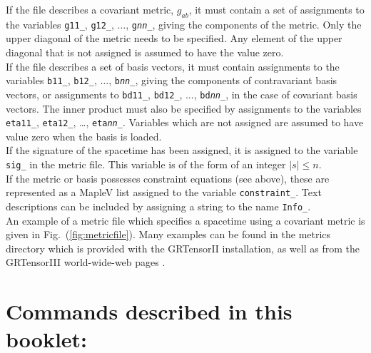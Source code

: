 \documentclass{article}
\begin{document}
If the file describes a covariant metric, $g_{ab}$, it must contain a
set of assignments to the variables \texttt{g11\_}, \texttt{g12\_},
$\ldots$, \texttt{g\textsl{nn}\_}, giving the components of the
metric. Only the upper diagonal of the metric needs to be
specified. Any element of the upper diagonal that is not assigned is
assumed to have the value zero.\\

If the file describes a set of basis vectors, it must contain
assignments to the variables \texttt{b11\_}, \texttt{b12\_}, $\ldots$,
\texttt{b\textsl{nn}\_}, giving the components of contravariant basis
vectors, or assignments to \texttt{bd11\_}, \texttt{bd12\_}, $\ldots$,
\texttt{bd\textsl{nn}\_}, in the case of covariant basis vectors. The
inner product must also be specified by assignments to the variables
\texttt{eta11\_}, \texttt{eta12\_}, \ldots, \texttt{eta\textsl{nn}\_}.
Variables which are not assigned are assumed to have value zero when
the basis is loaded.\\

If the signature of the spacetime has been assigned, it is assigned
to the variable \texttt{sig\_} in the metric file. This variable
is of the form of an integer $|s|\leq n$.\\

If the metric or basis possesses constraint equations (see above),
these are represented as a MapleV list assigned to the variable
\texttt{constraint\_}.  Text descriptions can be included by assigning
a string to the name \texttt{Info\_}.\\

An example of a metric file which specifies a spacetime using a covariant
metric is given in Fig.~(\ref{fig:metricfile}). Many examples can
be found in the metrics directory which is provided with the GRTensorII
installation, as well as from the GRTensorIII world-wide-web pages
\cite{www}.
%
\vfill


\pagebreak
\section*{Commands described in this booklet:}
  \noindent
    \dotfill \pageref{spec:makeg}\\
\end{document}
